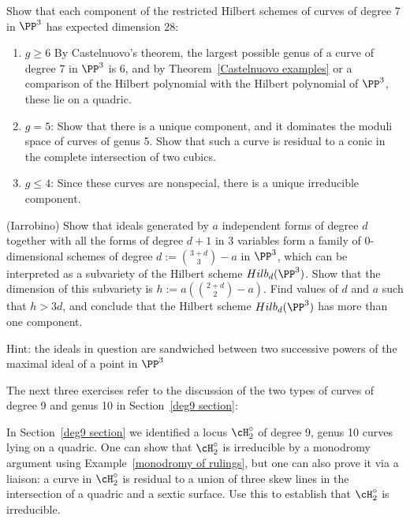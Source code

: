 \begin{exercise}\label{degree 7 analysis}
Show that each component of the restricted Hilbert schemes of curves of degree 7
in $\PP^3$ has expected dimension 28:
\begin{enumerate}
 \item $g\geq 6$
By Castelnuovo's theorem, the largest possible genus of a curve of degree 7 in $\PP^3$ is 6, and 
by Theorem~\ref{Castelnuovo examples} or a comparison of the Hilbert polynomial
with the Hilbert polynomial of $\PP^3$, these lie on a quadric.
 \item $g=5$: Show that there is a unique component, and it dominates the moduli space of curves of genus 5.
 Show that such a  curve is residual to a conic in the complete intersection of two cubics.
 \item $g\leq 4$: Since these curves are nonspecial,  there is a unique irreducible component.
\end{enumerate}
\end{exercise}


\begin{exercise}\label{bigger component}(Iarrobino)
Show that ideals generated by $a$ independent forms of degree $d$ together with all the forms of degree $d+1$ in 3 variables
form a family of 0-dimensional schemes of degree $d:={3+d\choose 3} -a$ in $\PP^3$, which can be interpreted as a subvariety
of the Hilbert scheme $Hilb_d(\PP^3)$. Show that the dimension of this subvariety is $h := a({2+d\choose 2}-a)$. Find values of
$d$ and $a$ such that $h>3d$, and conclude that the Hilbert scheme $Hilb_d(\PP^3)$ has more than one component.

Hint: the ideals in question are sandwiched between two successive powers of the maximal ideal of a point in $\PP^3$
\end{exercise}

 The next three exercises refer to the discussion of the two types of curves of degree 9 and genus 10 in Section~\ref{deg9 section}:
\begin{exercise}\label{degree 9 type 2 is irreducible}
In Section~\ref{deg9 section} we identified a locus $\cH^\circ_2$ of degree 9, genus 10 curves lying on a quadric.
One can show that $\cH^\circ_2$  is irreducible by a monodromy argument using Example~\ref{monodromy of rulings}, but one can also prove it via a liaison:  a curve in $\cH^\circ_2$ is residual to a union of three skew lines in the intersection of a quadric and a sextic surface. Use this to establish that $\cH^\circ_2$ is irreducible.
\end{exercise}

